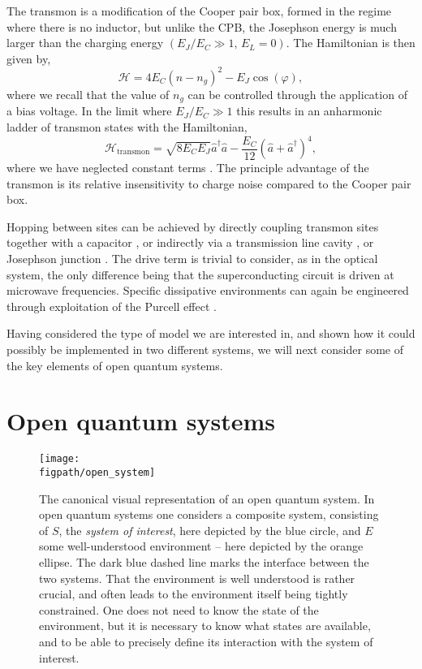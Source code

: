 The transmon is a modification of the Cooper pair box, formed in the regime where there is no inductor, but unlike the CPB, the Josephson energy is much larger than the charging energy \((E_{J} / E_{C} \gg 1,\, E_{L} = 0)\). The Hamiltonian is then given by,
\begin{equation}
	\mathcal{H} = 4E_{C}(\hat{n} - n_{g})^{2} - E_{J}\cos(\varphi),
	\label{eq:mbq2-10}
\end{equation}
where we recall that the value of \(n_{g}\) can be controlled through the application of a bias voltage. In the limit where \(E_{J}/E_{C} \gg 1\) this results in an anharmonic ladder of transmon states with the Hamiltonian,
\begin{equation}
	\mathcal{H}_{\mathrm{transmon}} = \sqrt{8E_{C}E_{J}}\hat{a}^{\dagger}\hat{a} - \frac{E_{C}}{12}\left(\hat{a} + \hat{a}^{\dagger}\right)^{4},
	\label{eq:mbq2-11}
\end{equation}
where we have neglected constant terms \cite{Koch2007}. The principle advantage of the transmon is its relative insensitivity to charge noise compared to the Cooper pair box.

Hopping between sites can be achieved by directly coupling transmon sites together with a capacitor \cite{Wendin2007}, or indirectly via a transmission line cavity \cite{Majer2007}, or Josephson junction \cite{Chen2014}. The drive term is trivial to consider, as in the optical system, the only difference being that the superconducting circuit is driven at microwave frequencies. Specific dissipative environments can again be engineered through exploitation of the Purcell effect \cite{Purcell1946,Fox_Purcell}.

Having considered the type of model we are interested in, and shown how it could possibly be implemented in two different systems, we will next consider some of the key elements of open quantum systems.

\section{\label{sec:OQS}Open quantum systems}

\begin{figure}[ht!]
\centering
\texttt{[image: \\figpath/open\_system]}
\caption{The canonical visual representation of an open quantum system. In open quantum systems one considers a composite system, consisting of \(S\), the \emph{system of interest}, here depicted by the blue circle, and \(E\) some well-understood environment -- here depicted by the orange ellipse. The dark blue dashed line marks the interface between the two systems. That the environment is well understood is rather crucial, and often leads to the environment itself being tightly constrained. One does not need to know the state of the environment, but it is necessary to know what states are available, and to be able to precisely define its interaction with the system of interest.}
\label{fig:oqs1-1}
\end{figure}

